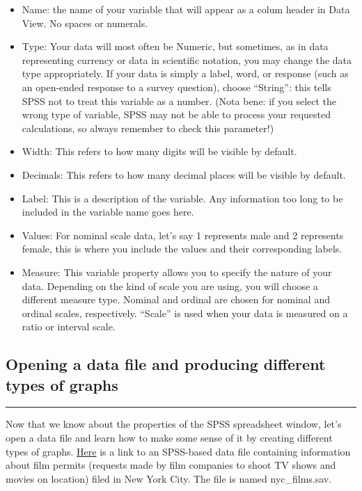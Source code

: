 \documentclass[]{book}
\providecommand{\tightlist}{%
  \setlength{\itemsep}{0pt}\setlength{\parskip}{0pt}}
\begin{document}
\begin{itemize}
\tightlist
\item
  Name: the name of your variable that will appear as a colum header in
  Data View. No spaces or numerals.
\item
  Type: Your data will most often be Numeric, but sometimes, as in data
  representing currency or data in scientific notation, you may change
  the data type appropriately. If your data is simply a label, word, or
  response (such as an open-ended response to a survey question), choose
  ``String'': this tells SPSS not to treat this variable as a number.
  (Nota bene: if you select the wrong type of variable, SPSS may not be
  able to process your requested calculations, so always remember to
  check this parameter!)
\item
  Width: This refers to how many digits will be visible by default.
\item
  Decimals: This refers to how many decimal places will be visible by
  default.
\item
  Label: This is a description of the variable. Any information too long
  to be included in the variable name goes here.
\item
  Values: For nominal scale data, let's say 1 represents male and 2
  represents female, this is where you include the values and their
  corresponding labels.
\item
  Measure: This variable property allows you to specify the nature of
  your data. Depending on the kind of scale you are using, you will
  choose a different measure type. Nominal and ordinal are chosen for
  nominal and ordinal scales, respectively. ``Scale'' is used when your
  data is measured on a ratio or interval scale.
\end{itemize}

\subsection{Opening a data file and producing different types of
graphs}\label{opening-a-data-file-and-producing-different-types-of-graphs}

\begin{center}\rule{0.5\linewidth}{0.5pt}\end{center}

Now that we know about the properties of the SPSS spreadsheet window,
let's open a data file and learn how to make some sense of it by
creating different types of graphs.
\href{https://github.com/CrumpLab/statisticsLab/blob/master/data/spssdata/nyc_films.sav}{Here}
is a link to an SPSS-based data file containing information about film
permits (requests made by film companies to shoot TV shows and movies on
location) filed in New York City. The file is named nyc\_films.sav.
\end{document}

